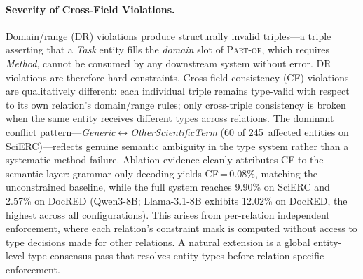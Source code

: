 \paragraph{Severity of Cross-Field Violations.}
Domain/range (DR) violations produce structurally invalid triples---a triple asserting that a \emph{Task} entity fills the \emph{domain} slot of \textsc{Part-of}, which requires \emph{Method}, cannot be consumed by any downstream system without error.
DR violations are therefore hard constraints.
Cross-field consistency (CF) violations are qualitatively different: each individual triple remains type-valid with respect to its own relation's domain/range rules; only cross-triple consistency is broken when the same entity receives different types across relations.
The dominant conflict pattern---\emph{Generic}$\leftrightarrow$\emph{OtherScientificTerm} (60 of 245~affected entities on SciERC)---reflects genuine semantic ambiguity in the type system rather than a systematic method failure.
Ablation evidence cleanly attributes CF to the semantic layer: grammar-only decoding yields CF\,=\,0.08\%, matching the unconstrained baseline, while the full system reaches 9.90\% on SciERC and 2.57\% on DocRED
(Qwen3-8B; Llama-3.1-8B exhibits 12.02\% on DocRED, the highest across all configurations).
This arises from per-relation independent enforcement, where each relation's constraint mask is computed without access to type decisions made for other relations.
A natural extension is a global entity-level type consensus pass that resolves entity types before relation-specific enforcement.


